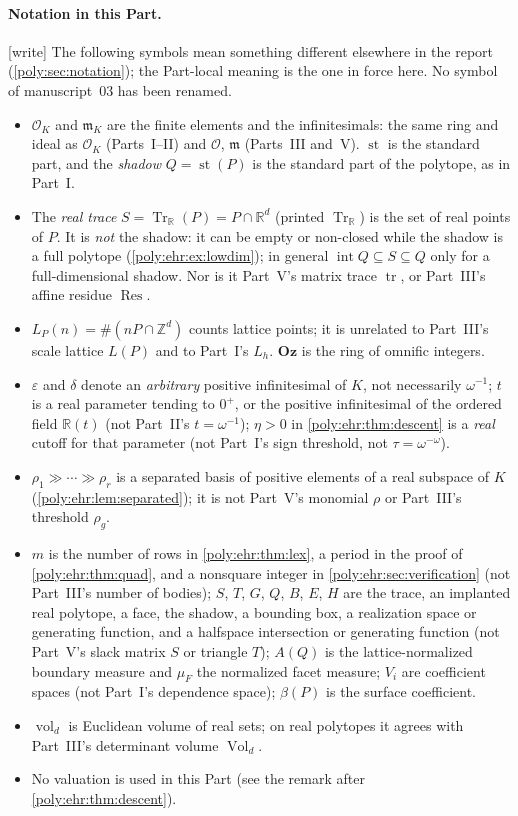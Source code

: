 \documentclass[11pt,a4paper]{article}
\numberwithin{equation}{section}
\theoremstyle{plain}
\newcommand{\wtag}{\textup{[write]}}%
\newcommand{\Oz}{\mathbf{Oz}}
\newcommand{\R}{\mathbb R}
\newcommand{\Z}{\mathbb Z}
\newcommand{\eps}{\varepsilon}
\newcommand{\st}{\operatorname{st}}
\newcommand{\cO}{\mathcal{O}}
\newcommand{\intr}{\operatorname{int}}
\newcommand{\vol}{\operatorname{vol}}
\newcommand{\Tr}{\operatorname{Tr}_{\R}}%
\newcommand{\OO}{\mathcal O}
\newcommand{\mm}{\mathfrak m}
\newcommand{\Vol}{\operatorname{Vol}}
\newcommand{\Res}{\operatorname{Res}}
\newcommand{\tr}{\operatorname{tr}}%
\begin{document}
\paragraph{Notation in this Part.}\wtag{} The following symbols mean something
different elsewhere in the report (\cref{poly:sec:notation}); the Part-local
meaning is the one in force here. No symbol of manuscript~03 has been renamed.
\begin{itemize}
\item $\mathcal O_K$ and $\mathfrak m_K$ are the finite elements and the
  infinitesimals: the same ring and ideal as $\cO_K$ (Parts~I--II) and $\OO$,
  $\mm$ (Parts~III and~V). $\st$ is the standard part, and the \emph{shadow}
  $Q=\st(P)$ is the standard part of the polytope, as in Part~I.
\item The \emph{real trace} $S=\Tr(P)=P\cap\R^d$ (printed $\operatorname{Tr}_{\R}$)
  is the set of real points of $P$. It is \emph{not} the shadow: it can be
  empty or non-closed while the shadow is a full polytope
  (\cref{poly:ehr:ex:lowdim}); in general $\intr Q\subseteq S\subseteq Q$
  only for a full-dimensional shadow. Nor is it Part~V's matrix trace $\tr$,
  or Part~III's affine residue $\Res$.
\item $L_P(n)=\#(nP\cap\Z^d)$ counts lattice points; it is unrelated to
  Part~III's scale lattice $L(P)$ and to Part~I's $L_h$. $\Oz$ is the ring of
  omnific integers.
\item $\eps$ and $\delta$ denote an \emph{arbitrary} positive infinitesimal of
  $K$, not necessarily $\omega^{-1}$; $t$ is a real parameter tending to $0^+$,
  or the positive infinitesimal of the ordered field $\R(t)$ (not Part~II's
  $t=\omega^{-1}$); $\eta>0$ in \cref{poly:ehr:thm:descent} is a \emph{real}
  cutoff for that parameter (not Part~I's sign threshold, not
  $\tau=\omega^{-\omega}$).
\item $\rho_1\gg\cdots\gg\rho_r$ is a separated basis of positive elements of
  a real subspace of $K$ (\cref{poly:ehr:lem:separated}); it is not Part~V's
  monomial $\rho$ or Part~III's threshold $\rho_g$.
\item $m$ is the number of rows in \cref{poly:ehr:thm:lex}, a period in the
  proof of \cref{poly:ehr:thm:quad}, and a nonsquare integer in
  \cref{poly:ehr:sec:verification} (not Part~III's number of bodies);
  $S$, $T$, $G$, $Q$, $B$, $E$, $H$ are the trace, an implanted real polytope,
  a face, the shadow, a bounding box, a realization space or generating
  function, and a halfspace intersection or generating function (not Part~V's
  slack matrix $S$ or triangle $T$); $A(Q)$ is the lattice-normalized boundary
  measure and $\mu_F$ the normalized facet measure; $V_i$ are coefficient
  spaces (not Part~I's dependence space); $\beta(P)$ is the surface
  coefficient.
\item $\vol_d$ is Euclidean volume of real sets; on real polytopes it agrees
  with Part~III's determinant volume $\Vol_d$.
\item No valuation is used in this Part (see the remark after
  \cref{poly:ehr:thm:descent}).
\end{itemize}
\end{document}
